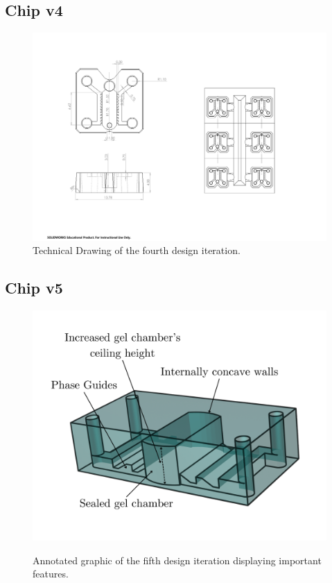 \documentclass[letterpaper,12pt]{article}
\begin{document}
\clearpage
\subsection{Chip v4}
\begin{figure}[!h]
    \centering
    \includegraphics[width=1\linewidth]{PDF/TDV4.pdf}
    \caption{Technical Drawing of the fourth design iteration.}
    \label{fig:TDV4}
\end{figure}
\newpage

\subsection{Chip v5}
\begin{figure}[!h]
    \centering
    \includegraphics[width=1\linewidth]{dapp_report/figures/final_iter.png}
    \label{fig:final_iter}
    \caption{Annotated graphic of the fifth design iteration displaying important features.}
\end{figure}
\end{document}
